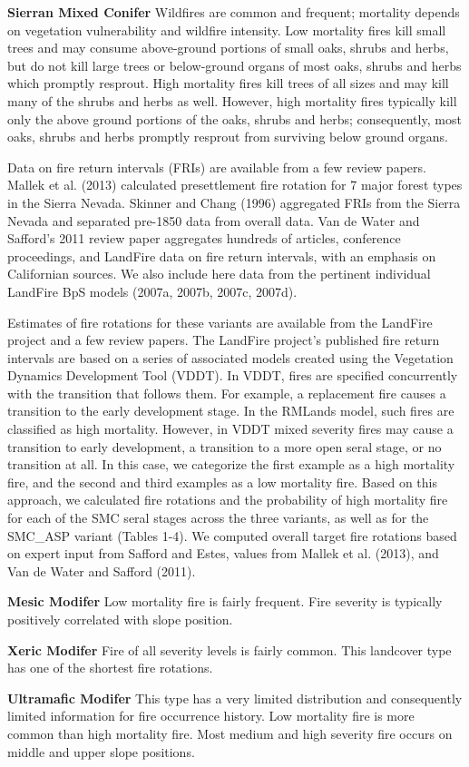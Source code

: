 \textbf{Sierran Mixed Conifer } Wildfires are common and frequent; mortality depends on vegetation vulnerability and wildfire intensity. Low mortality fires kill small trees and may consume above-ground portions of small oaks, shrubs and herbs, but do not kill large trees or below-ground organs of most oaks, shrubs and herbs which promptly resprout. High mortality fires kill trees of all sizes and may kill many of the shrubs and herbs as well. However, high mortality fires typically kill only the above ground portions of the oaks, shrubs and herbs; consequently, most oaks, shrubs and herbs promptly resprout from surviving below ground organs.

Data on fire return intervals (FRIs) are available from a few review papers. Mallek et al. (2013) calculated presettlement fire rotation for 7 major forest types in the Sierra Nevada. Skinner and Chang (1996) aggregated FRIs from the Sierra Nevada and separated pre-1850 data from overall data. Van de Water and Safford’s 2011 review paper aggregates hundreds of articles, conference proceedings, and LandFire data on fire return intervals, with an emphasis on Californian sources. We also include here data from the pertinent individual LandFire BpS models (2007a, 2007b, 2007c, 2007d).

Estimates of fire rotations for these variants are available from the LandFire project and a few review papers. The LandFire project’s published fire return intervals are based on a series of associated models created using the Vegetation Dynamics Development Tool (VDDT). In VDDT, fires are specified concurrently with the transition that follows them. For example, a replacement fire causes a transition to the early development stage. In the RMLands model, such fires are classified as high mortality. However, in VDDT mixed severity fires may cause a transition to early development, a transition to a more open seral stage, or no transition at all. In this case, we categorize the first example as a high mortality fire, and the second and third examples as a low mortality fire. Based on this approach, we calculated fire rotations and the probability of high mortality fire for each of the SMC seral stages across the three variants, as well as for the SMC\_ASP variant (Tables 1-4). We computed overall target fire rotations based on expert input from Safford and Estes, values from Mallek et al. (2013), and Van de Water and Safford (2011). 


\begin{adjustwidth}{2cm}{}
\textbf{Mesic Modifer } Low mortality fire is fairly frequent. Fire severity is typically positively correlated with slope position. 

\textbf{Xeric Modifer} Fire of all severity levels is fairly common. This landcover type has one of the shortest fire rotations. 

\textbf{Ultramafic Modifer} This type has a very limited distribution and consequently limited information for fire occurrence history. Low mortality fire is more common than high mortality fire. Most medium and high severity fire occurs on middle and upper slope positions.

\end{adjustwidth}

